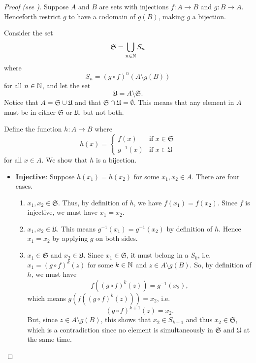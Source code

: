 \begin{proof}[Proof (see {\cite[Theorem 14.10, pp.~286--287]{hammack_2018}})]
    Suppose $A$ and $B$ are sets with injections $f: A \to B$ and $g: B \to A$. Henceforth restrict $g$ to have a codomain of $g(B)$, making $g$ a bijection.

    Consider the set
    \[
        \mathfrak{S} = \bigcup_{n \in \mathbb{N}} S_n
    \]
    where
    \[
        S_n = (g \circ f)^n(A \setminus g(B))
    \]
    for all $n \in \mathbb{N}$, and let the set
    \[
        \mathfrak{U} = A \setminus \mathfrak{S}.
    \]
    Notice that $A = \mathfrak{S} \cup \mathfrak{U}$ and that $\mathfrak{S} \cap \mathfrak{U} = \emptyset$. This means that any element in $A$ must be in either $\mathfrak{S}$ or $\mathfrak{U}$, but not both.
    
    Define the function $h: A \to B$ where
    \[
        h(x) = \begin{cases}
            f(x) & \text{if } x \in \mathfrak{S}\\
            g^{-1}(x) & \text{if } x \in \mathfrak{U}
        \end{cases}
    \]
    for all $x \in A$. We show that $h$ is a bijection.
    \begin{itemize}
        \item \textbf{Injective}: Suppose $h(x_1) = h(x_2)$ for some $x_1, x_2 \in A$. There are four cases.
        \begin{enumerate}
            \item $x_1, x_2 \in \mathfrak{S}$. Thus, by definition of $h$, we have $f(x_1) = f(x_2)$. Since $f$ is injective, we must have $x_1 = x_2$.
            
            \item $x_1, x_2 \in \mathfrak{U}$. This means $g^{-1}(x_1) = g^{-1}(x_2)$ by definition of $h$. Hence $x_1 = x_2$ by applying $g$ on both sides.
            
            \item $x_1 \in \mathfrak{S}$ and $x_2 \in \mathfrak{U}$. Since $x_1 \in \mathfrak{S}$, it must belong in a $S_k$, i.e. $x_1 = (g\circ f)^k(z)$ for some $k \in \mathbb{N}$ and $z \in A \setminus g(B)$. So, by definition of $h$, we must have
            \[
                f((g\circ f)^k(z)) = g^{-1}(x_2),
            \]
            which means $g(f((g\circ f)^k(z))) = x_2$, i.e.
            \[
                (g \circ f)^{k+1}(z) = x_2.
            \]
            But, since $z \in A \setminus g(B)$, this shows that $x_2 \in S_{k+1}$ and thus $x_2 \in \mathfrak{S}$, which is a contradiction since no element is simultaneously in $\mathfrak{S}$ and $\mathfrak{U}$ at the same time.
            

\end{enumerate}
\end{itemize}
\end{proof}
